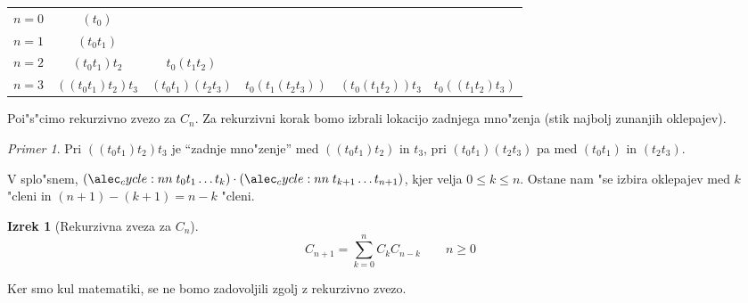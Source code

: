 \documentclass[a4paper,12pt]{article}
\theoremstyle{definition}
\newtheorem{theorem}[counter]{Izrek}
\theoremstyle{remark}
\newtheorem*{ex}{Primer}
\begin{document}
\begin{tabular}{c c c c c c}
	$n = 0$& $(t_0)$ & & & &\\
	$n = 1$& $(t_0 t_1)$ & & & &\\
	$n = 2$& $(t_0 t_1) t_2$ & $t_0 (t_1 t_2)$ & & &\\
	$n = 3$& $((t_0 t_1) t_2) t_3$  &  $(t_0 t_1) (t_2 t_3)$ & $t_0 (t_1 (t_2 t_3))$ & $(t_0 (t_1 t_2)) t_3$ & $t_0 ((t_1 t_2) t_3)$
\end{tabular}

Poi"s"cimo rekurzivno zvezo za $C_n$. Za rekurzivni korak bomo izbrali lokacijo zadnjega mno"zenja (stik najbolj zunanjih oklepajev).
\begin{ex}
	Pri $((t_0 t_1) t_2) t_3$ je ``zadnje mno"zenje'' med $((t_0 t_1) t_2)$ in $t_3$, pri $(t_0 t_1) (t_2 t_3)$ pa med $(t_0 t_1)$ in $(t_2 t_3)$.
\end{ex}
V splo"snem, $\cycle{t_0 t_1 \ldots t_k} \cdot \cycle{t_{k + 1} \ldots t_{n+1}}$, kjer velja $0 \leqslant k \leqslant n$.
Ostane nam "se izbira oklepajev med $k$ "cleni in $(n+1)-(k+1)=n-k$ "cleni.

\begin{theorem}[Rekurzivna zveza za $C_n$]
	\[C_{n + 1} = \sum_{k = 0}^{n} C_k C_{n - k} \qquad n \geqslant 0\]
\end{theorem}

Ker smo kul matematiki, se ne bomo zadovoljili zgolj z rekurzivno zvezo.
\end{document}
